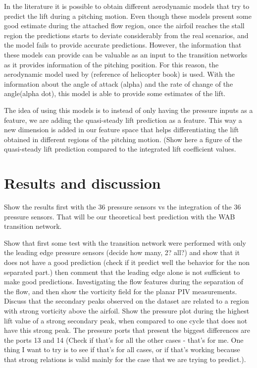 \documentclass[%
 reprint,
 amsmath,amssymb,
 aps,
]{revtex4-2}
\begin{document}
In the literature it is possible to obtain different aerodynamic models that try to predict the lift during a pitching motion. 
Even though these models present some good estimate during the attached flow region, once the airfoil reaches the stall region the predictions starts to deviate considerably from the real scenarios, and the model fails to provide accurate predictions. 
However, the information that these models can provide can be valuable as an input to the transition networks as it provides information of the pitching position. 
For this reason, the aerodynamic model used by (reference of helicopter book) is used. 
With the information about the angle of attack (alpha) and the rate of change of the angle(alpha dot), this model is able to provide some estimates of the lift.

The idea of using this models is to instead of only having the pressure inputs as a feature, we are adding the quasi-steady lift prediction as a feature. 
This way a new dimension is added in our feature space that helps differentiating the lift obtained in different regions of the pitching motion. 
(Show here a figure of the quasi-steady lift prediction compared to the integrated lift coefficient values.


\section{Results and discussion}


Show the results first with the 36 pressure sensors vs the integration of the 36 pressure sensors. 
That will be our theoretical best prediction with the WAB transition network.

Show that first some test with the transition network were performed with only the leading edge pressure sensors (decide how many, 2? all?) and show that it does not have a good prediction (check if it predict well the behavior for the non separated part.) 
then comment that the leading edge alone is not sufficient to make good predictions. 
Investigating the flow features during the separation of the flow, and then show the vorticity field for the planar PIV measurements. 
Discuss that the secondary peaks observed on the dataset are related to a region with strong vorticity above the airfoil. 
Show the pressure plot during the highest lift value of a strong secondary peak, when compared to one cycle that does not have this strong peak.
The pressure ports that present the biggest differences are the ports 13 and 14 (Check if that's for all the other cases - that's for me. 
One thing I want to try is to see if that's for all cases, or if that's working because that strong relations is valid mainly for the case that we are trying to predict.). 
\end{document}
